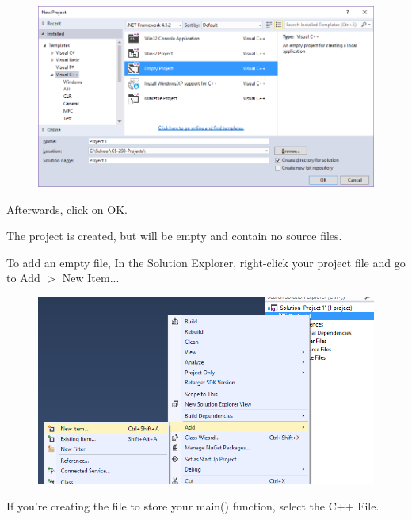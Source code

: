                 \begin{figure}[h]
                    \centering
                    \includegraphics[width=14cm]{images-2018-01/vs-newproject2.png}
                \end{figure}

                Afterwards, click on OK.

                The project is created, but will be empty and contain no source files.

                To add an empty file, In the Solution Explorer, right-click your project file and go to Add $>$ New Item...

                \begin{figure}[h]
                    \centering
                    \includegraphics[width=12cm]{images-2018-01/vs-addnewitem.png}
                \end{figure}

                If you're creating the file to store your main() function, select the C++ File.
                
